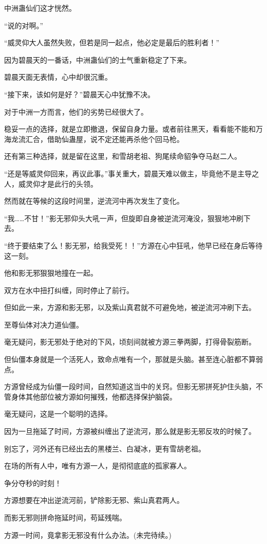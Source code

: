 \begin{this_body}
中洲蛊仙们这才恍然。

“说的对啊。”

“威灵仰大人虽然失败，但若是同一起点，他必定是最后的胜利者！”

因为碧晨天的一番话，中洲蛊仙们的士气重新稳定了下来。

碧晨天面无表情，心中却很沉重。

“接下来，该如何是好？”碧晨天心中犹豫不决。

对于中洲一方而言，他们的劣势已经很大了。

稳妥一点的选择，就是立即撤退，保留自身力量。或者前往黑天，看看能不能和万海龙流汇合，借助仙蛊屋，说不定还能再杀他个回马枪。

还有第三种选择，就是留在这里，和雪胡老祖、狗尾续命貂争夺马赵二人。

“还是等威灵仰回来，再议此事。”事关重大，碧晨天难以做主，毕竟他不是主导之人，威灵仰才是此行的头领。

然而就在等候的这段时间里，逆流河中再次发生了变化。

“我……不甘！”影无邪仰头大吼一声，但旋即自身被逆流河淹没，狠狠地冲刷下去。

“终于要结束了么！影无邪，给我受死！！”方源在心中狂吼，他早已经在身后等待这一刻。

他和影无邪狠狠地撞在一起。

双方在水中扭打纠缠，同时停止了前行。

但如此一来，方源和影无邪，以及紫山真君就不可避免地，被逆流河冲刷下去。

至尊仙体对决力道仙僵。

毫无疑问，影无邪处于绝对的下风，顷刻间就被方源三拳两脚，打得骨裂筋断。

但仙僵本身就是一个活死人，致命点唯有一个，那就是头脑。甚至连心脏都不算弱点。

方源曾经成为仙僵一段时间，自然知道这当中的关窍。但影无邪拼死护住头脑，不管身体其他部位被方源如何摧残，他都选择保护脑袋。

毫无疑问，这是一个聪明的选择。

因为一旦拖延了时间，方源被纠缠出了逆流河，那么就是影无邪反攻的时候了。

别忘了，河外还有已经出去的黑楼兰、白凝冰，更有雪胡老祖。

在场的所有人中，唯有方源一人，是彻彻底底的孤家寡人。

争分夺秒的时刻！

方源想要在冲出逆流河前，铲除影无邪、紫山真君两人。

而影无邪则拼命拖延时间，苟延残喘。

方源一时间，竟拿影无邪没有什么办法。(未完待续。)

\end{this_body}

